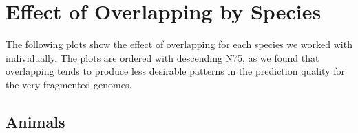 \documentclass{article}
\begin{document}
\newpage
\section{Effect of Overlapping by Species}
\label{sec:overlapping}

The following plots show the effect of overlapping for each species we worked with individually. The plots are ordered with descending N75, as we found that overlapping tends to produce less desirable patterns in the prediction quality for the very fragmented genomes. 

\subsection{Animals}
\newpage

\end{document}
